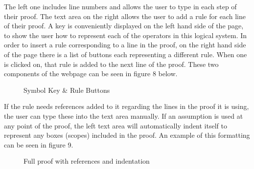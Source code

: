 The left one includes line numbers and allows the user to type in each step of their proof. The text area on the right allows the user to add a rule for each line of their proof. A key is conveniently displayed on the left hand side of the page, to show the user how to represent each of the operators in this logical system. In order to insert a rule corresponding to a line in the proof, on the right hand side of the page there is a list of buttons each representing a different rule. When one is clicked on, that rule is added to the next line of the proof. These two components of the webpage can be seen in figure 8 below.

\begin{figure}[!ht]
	\centering
	\caption{Symbol Key \& Rule Buttons}
\end{figure}

If the rule needs references added to it regarding the lines in the proof it is using, the user can type these into the text area manually. If an assumption is used at any point of the proof, the left text area will automatically indent itself to represent any boxes (scopes) included in the proof. An example of this formatting can be seen in figure 9.

\begin{figure}[!ht]
	\centering
	\caption{Full proof with references and indentation}
\end{figure}


